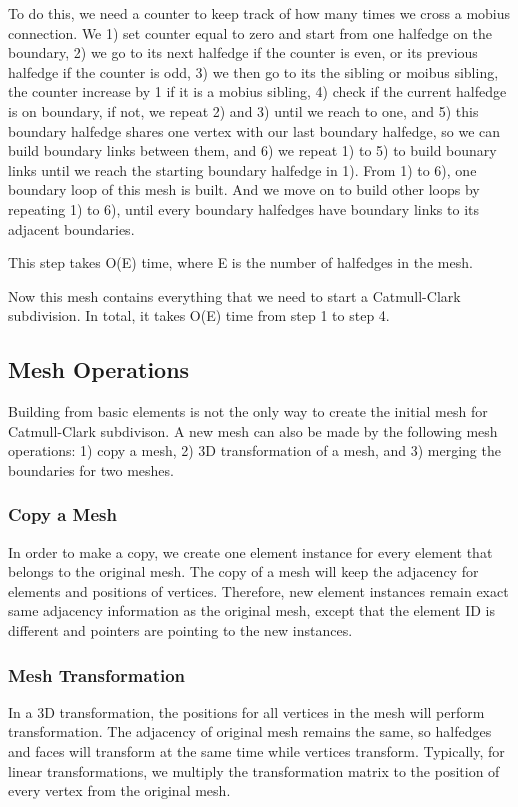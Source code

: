 \documentclass[12pt]{article}
\begin{document}
To do this, we need a counter to keep track of how many times we cross a mobius connection. We 1) set counter equal to zero and start from one halfedge on the boundary, 2) we go to its next halfedge if the counter is even, or its previous halfedge if the counter is odd, 3) we then go to its the sibling or moibus sibling, the counter increase by 1 if it is a mobius sibling, 4) check if the current halfedge is on boundary, if not, we repeat 2) and 3) until we reach to one, and 5) this boundary halfedge shares one vertex with our last boundary halfedge, so we can build boundary links between them, and 6) we repeat 1) to 5) to build bounary links until we reach the starting boundary halfedge in 1). From 1) to 6), one boundary loop of this mesh is built. And we move on to build other loops by repeating 1) to 6), until every boundary halfedges have boundary links to its adjacent boundaries.

This step takes O(E) time, where E is the number of halfedges in the mesh.

Now this mesh contains everything that we need to start a Catmull-Clark subdivision. In total, it takes O(E) time from step 1 to step 4.

\subsection{Mesh Operations}
Building from basic elements is not the only way to create the initial mesh for Catmull-Clark subdivison. A new mesh can also be made by the following mesh operations: 1) copy a mesh, 2) 3D transformation of a mesh, and 3) merging the boundaries for two meshes. 

\subsubsection{Copy a Mesh}
In order to make a copy, we create one element instance for every element that belongs to the original mesh. The copy of a mesh will keep the adjacency for elements and positions of vertices. Therefore, new element instances remain exact same adjacency information as the original mesh, except that the element ID is different and pointers are pointing to the new instances. 

\subsubsection{Mesh Transformation}
In a 3D transformation, the positions for all vertices in the mesh will perform transformation. The adjacency of original mesh remains the same, so halfedges and faces will transform at the same time while vertices transform. Typically, for linear transformations, we multiply the transformation matrix to the position of every vertex from the original mesh.
\end{document}
